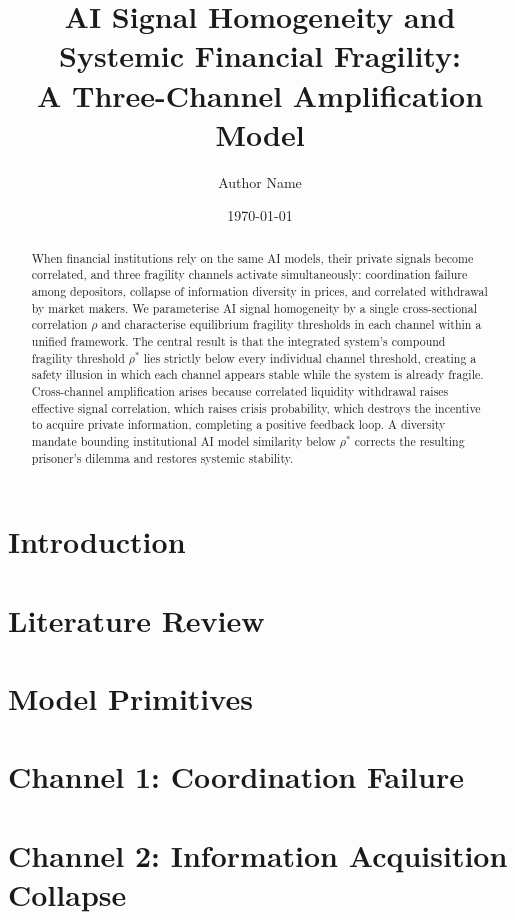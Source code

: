\documentclass[12pt]{article}
\title{AI Signal Homogeneity and Systemic Financial Fragility:\\
A Three-Channel Amplification Model}
\author{Author Name}
\date{\today}
\theoremstyle{remark}
\begin{document}
\maketitle

\begin{abstract}
When financial institutions rely on the same AI models, their private signals become correlated, and three fragility channels activate simultaneously: coordination failure among depositors, collapse of information diversity in prices, and correlated withdrawal by market makers. We parameterise AI signal homogeneity by a single cross-sectional correlation $\rho$ and characterise equilibrium fragility thresholds in each channel within a unified framework. The central result is that the integrated system's compound fragility threshold $\rho^*$ lies strictly below every individual channel threshold, creating a safety illusion in which each channel appears stable while the system is already fragile. Cross-channel amplification arises because correlated liquidity withdrawal raises effective signal correlation, which raises crisis probability, which destroys the incentive to acquire private information, completing a positive feedback loop. A diversity mandate bounding institutional AI model similarity below $\rho^*$ corrects the resulting prisoner's dilemma and restores systemic stability.
\end{abstract}

\section{Introduction}


\section{Literature Review}


\section{Model Primitives}


\section{Channel 1: Coordination Failure}


\section{Channel 2: Information Acquisition Collapse}

\end{document}

